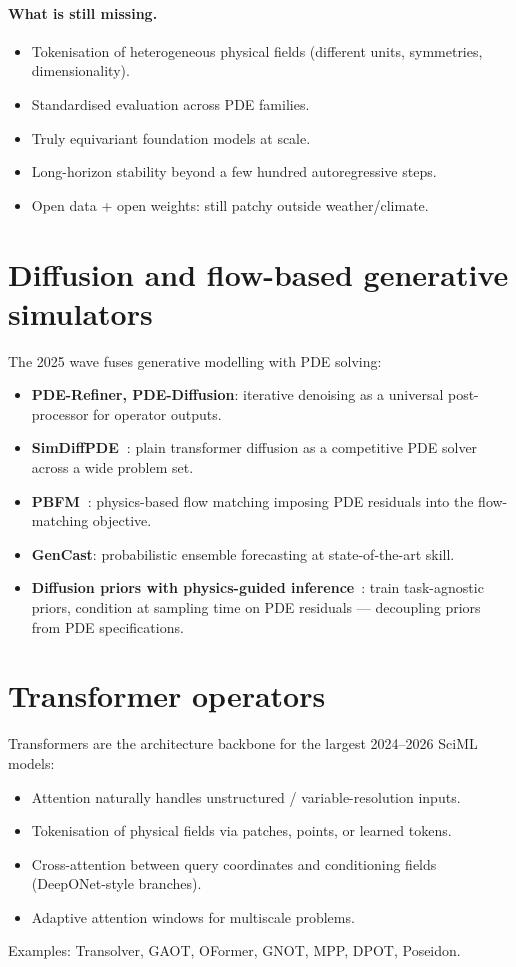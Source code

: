 \paragraph{What is still missing.}
\begin{itemize}
\item Tokenisation of heterogeneous physical fields (different units,
symmetries, dimensionality).
\item Standardised evaluation across PDE families.
\item Truly equivariant foundation models at scale.
\item Long-horizon stability beyond a few hundred autoregressive steps.
\item Open data + open weights: still patchy outside weather/climate.
\end{itemize}

\section{Diffusion and flow-based generative simulators}
The 2025 wave fuses generative modelling with PDE solving:
\begin{itemize}
\item \textbf{PDE-Refiner, PDE-Diffusion}: iterative denoising as a
universal post-processor for operator outputs.
\item \textbf{SimDiffPDE~\cite{simdiffpde2025}}: plain transformer
diffusion as a competitive PDE solver across a wide problem set.
\item \textbf{PBFM~\cite{pbfm2025}}: physics-based flow matching
imposing PDE residuals into the flow-matching objective.
\item \textbf{GenCast}: probabilistic ensemble forecasting at
state-of-the-art skill.
\item \textbf{Diffusion priors with physics-guided
inference}~\cite{diffphys2026}: train task-agnostic priors, condition at
sampling time on PDE residuals --- decoupling priors from PDE
specifications.
\end{itemize}

\section{Transformer operators}
Transformers are the architecture backbone for the largest 2024--2026
SciML models:
\begin{itemize}
\item Attention naturally handles unstructured / variable-resolution
inputs.
\item Tokenisation of physical fields via patches, points, or learned
tokens.
\item Cross-attention between query coordinates and conditioning
fields (DeepONet-style branches).
\item Adaptive attention windows for multiscale problems.
\end{itemize}
Examples: Transolver, GAOT, OFormer, GNOT, MPP, DPOT, Poseidon.

